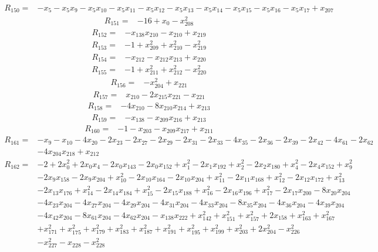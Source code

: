 \begin{align*}
 R_{150}={}&-x_{5} -x_{5}x_{9} -x_{5}x_{10} -x_{5}x_{11} -x_{5}x_{12} -x_{5}x_{13} -x_{5}x_{14} -x_{5}x_{15} -x_{5}x_{16} -x_{5}x_{17} +x_{207}
\end{align*}
\begin{align*}
 R_{151}={}&-16 +x_{0} -x_{208}^{2}
\end{align*}
\begin{align*}
 R_{152}={}&-x_{138}x_{210} -x_{210} +x_{219}
\end{align*}
\begin{align*}
 R_{153}={}&-1 +x_{209}^{2} +x_{210}^{2} -x_{219}^{2}
\end{align*}
\begin{align*}
 R_{154}={}&-x_{212} -x_{212}x_{213} +x_{220}
\end{align*}
\begin{align*}
 R_{155}={}&-1 +x_{211}^{2} +x_{212}^{2} -x_{220}^{2}
\end{align*}
\begin{align*}
 R_{156}={}&-x_{204}^{2} +x_{221}
\end{align*}
\begin{align*}
 R_{157}={}&x_{210} -2x_{215}x_{221} -x_{221}
\end{align*}
\begin{align*}
 R_{158}={}&-4x_{210} -8x_{210}x_{214} +x_{213}
\end{align*}
\begin{align*}
 R_{159}={}&-x_{138} -x_{209}x_{216} +x_{213}
\end{align*}
\begin{align*}
 R_{160}={}&-1 -x_{203} -x_{209}x_{217} +x_{211}
\end{align*}
\begin{align*}
 R_{161}={}&-x_{9} -x_{10} -4x_{20} -2x_{23} -2x_{27} -2x_{29} -2x_{31} -2x_{33} -4x_{35} -2x_{36} -2x_{39} -2x_{42} -4x_{61} -2x_{62}\\
 &-4x_{204}x_{218} +x_{212}
\end{align*}
\begin{align*}
 R_{162}={}&-2 +2x_{0}^{2} +2x_{0}x_{4} -2x_{0}x_{143} -2x_{0}x_{152} +x_{1}^{2} -2x_{1}x_{192} +x_{2}^{2} -2x_{2}x_{180} +x_{4}^{2} -2x_{4}x_{152} +x_{9}^{2}\\
 &-2x_{9}x_{158} -2x_{9}x_{204} +x_{10}^{2} -2x_{10}x_{164} -2x_{10}x_{204} +x_{11}^{2} -2x_{11}x_{168} +x_{12}^{2} -2x_{12}x_{172} +x_{13}^{2}\\
 &-2x_{13}x_{176} +x_{14}^{2} -2x_{14}x_{184} +x_{15}^{2} -2x_{15}x_{188} +x_{16}^{2} -2x_{16}x_{196} +x_{17}^{2} -2x_{17}x_{200} -8x_{20}x_{204}\\
 &-4x_{23}x_{204} -4x_{27}x_{204} -4x_{29}x_{204} -4x_{31}x_{204} -4x_{33}x_{204} -8x_{35}x_{204} -4x_{36}x_{204} -4x_{39}x_{204}\\
 &-4x_{42}x_{204} -8x_{61}x_{204} -4x_{62}x_{204} -x_{138}x_{222} +x_{142}^{2} +x_{151}^{2} +x_{157}^{2} +2x_{158} +x_{163}^{2} +x_{167}^{2}\\
 &+x_{171}^{2} +x_{175}^{2} +x_{179}^{2} +x_{183}^{2} +x_{187}^{2} +x_{191}^{2} +x_{195}^{2} +x_{199}^{2} +x_{203}^{2} +2x_{204}^{2} -x_{226}^{2}\\
 &-x_{227}^{2} -x_{228} -x_{228}^{2}
\end{align*}
